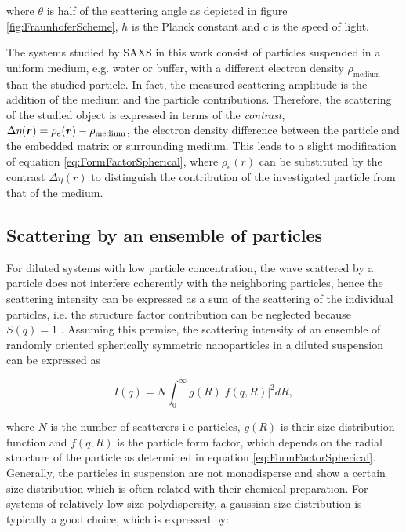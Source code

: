 where \(\theta\) is half of the scattering angle as depicted in figure \ref{fig:FraunhoferScheme}, \(h\) is the Planck constant and \(c\) is the speed of light.

The systems studied by SAXS in this work consist of particles suspended in a uniform medium, e.g. water or buffer, with a different electron density $\rho_{\text{medium}}$ than the studied particle. In fact, the measured scattering amplitude is the addition of the medium and the particle contributions. Therefore, the scattering of the studied object is expressed in terms of the \emph{contrast}, $\Delta \eta (\bm{r}) = \rho_e(\bm{r}) - \rho_{\text{medium}}$, the electron density difference between the particle and the embedded matrix or surrounding medium. This leads to a slight modification of equation \ref{eq:FormFactorSpherical}, where $\rho_e(r)$ can be substituted by the contrast $\Delta\eta(r)$ to distinguish the contribution of the investigated particle from that of the medium.

\subsection{Scattering by an ensemble of particles}

For diluted systems with low particle concentration, the wave scattered by a particle does not interfere coherently with the neighboring particles, hence the scattering intensity can be expressed as a sum of the scattering of the individual particles, i.e. the structure factor contribution can be neglected because $S(q)=1$ \citep{feigin_structure_1987}. Assuming this premise, the scattering intensity of an ensemble of randomly oriented spherically symmetric nanoparticles in a diluted suspension can be expressed as

\begin{equation}
\label{eq:intensity}
I(q)=N\int_{0}^{\infty} g(R)\left|f(q,R) \right|^2 dR,
\end{equation}

where \(N\) is the number of scatterers i.e particles, \(g(R)\) is their size distribution function and \(f(q,R)\) is the particle form factor, which depends on the radial structure of the particle as determined in equation \ref{eq:FormFactorSpherical}. Generally, the particles in suspension are not monodisperse and show a certain size distribution which is often related with their chemical preparation. For systems of relatively low size polydispersity, a gaussian size distribution is typically a good choice, which is expressed by:


